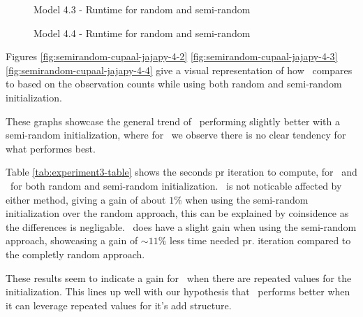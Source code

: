\begin{figure}[htb!]
    
    \caption{Model 4.3 - Runtime for random and semi-random}
    \label{fig:semirandom-cupaal-jajapy-4-3}
\end{figure}

\begin{figure}[htb!]
    
    \caption{Model 4.4 - Runtime for random and semi-random}
    \label{fig:semirandom-cupaal-jajapy-4-4}
\end{figure}

Figures \autoref{fig:semirandom-cupaal-jajapy-4-2} \autoref{fig:semirandom-cupaal-jajapy-4-3} \autoref{fig:semirandom-cupaal-jajapy-4-4} give a visual representation of how \Cupaal\ compares to \Jajapy based on the observation counts while using both random and semi-random initialization.

These graphs showcase the general trend of \Cupaal\ performing slightly better with a semi-random initialization, where for \Jajapy\ we observe there is no clear tendency for what performes best.

Table \autoref{tab:experiment3-table} shows the seconds pr iteration to compute, for \Cupaal\ and \Jajapy\ for both random and semi-random initialization.
\Jajapy\ is not noticable affected by either method, giving a gain of about $1\%$ when using the semi-random initialization over the random approach, this can be explained by coinsidence as the differences is negligable.
\Cupaal\ does have a slight gain when using the semi-random approach, showcasing a gain of $\sim 11\%$ less time needed pr. iteration compared to the completly random approach.

These results seem to indicate a gain for \Cupaal\ when there are repeated values for the initialization.
This lines up well with our hypothesis that \Cupaal\ performs better when it can leverage repeated values for it's \gls{add} structure.

